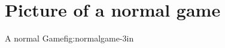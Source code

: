 \section{Picture of a normal game}
\label{label:normalgame}
			{A normal Game}{fig:normalgame}{-3in}		